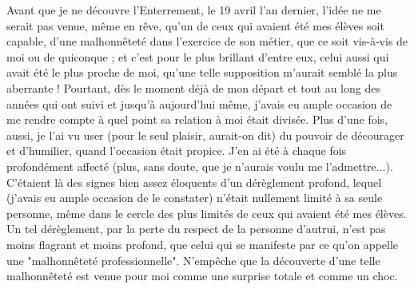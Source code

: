 Avant que je ne découvre l'Enterrement, le 19 avril l'an dernier, l'idée ne me serait pas venue, même en rêve, qu'un de ceux qui avaient été mes élèves soit capable, d'une malhonnêteté dans l'exercice de son métier, que ce soit vis-à-vis de moi ou de quiconque ; et c'est pour le plus brillant d'entre eux, celui aussi qui avait été le plus proche de moi, qu'une telle supposition m'aurait semblé la plus aberrante ! Pourtant, dès le moment déjà de mon départ et tout au long des années qui ont suivi et jusqu'à aujourd'hui même, j'avais eu ample occasion de me rendre compte à quel point sa relation à moi était divisée. Plus d'une fois, aussi, je l'ai vu user (pour le seul plaisir, aurait-on dit) du pouvoir de décourager et d'humilier, quand l'occasion était propice. J'en ai été à chaque fois profondément affecté (plus, sans doute, que je n'aurais voulu me l'admettre...). C'étaient là des signes bien assez éloquents d'un dérèglement profond, lequel (j'avais eu ample occasion de le constater) n'était nullement limité à sa seule personne, même dans le cercle des plus limités de ceux qui avaient été mes élèves. Un tel dérèglement, par la perte du respect de la personne d'autrui, n'est pas moins flagrant et moins profond, que celui qui se manifeste par ce qu'on appelle une "malhonnêteté professionnelle". N'empêche que la découverte d'une telle malhonnêteté est venue pour moi comme une surprise totale et comme un choc.

